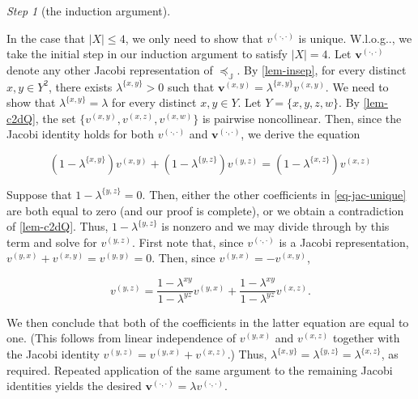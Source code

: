 \documentclass[ecta,nameyear,draft]{econsocart}
\makeatletter
\newcommand{\mbbj}{\mathds J}
\newcommand{\xy}{{(x, y)}}
\newcommand{\yx}{{(y, x)}}
\newcommand{\yz}{{(y,z)}}
\newcommand{\xz}{{(x,z)}}
\newcommand{\xw}{{(x,w)}}
\newcommand{\dd}{{(\cdot,\cdot)}}
\newcommand\Wlog{W\@.l\@.o\@.g\@ifnextchar.{}{.\@}}
\theoremstyle{plain}
\theoremstyle{remark}
\newtheorem{step}{Step}[section]
\makeatother
\begin{document}
\begin{appendix}
\begin{step}[the induction argument]
\begin{proofEnd}
    In the case that $\lvert X \rvert \leq 4$, we only need to show that $v^{
      \dd}$ is unique. \Wlog, we take the initial step in our induction argument
    to satisfy $\lvert X \rvert = 4$.  Let $\mathbf v^{\dd}$ denote any other
    Jacobi representation of $\preceq_{\mbbj}$. By \cref{lem-insep}, for every
    distinct $x , y \in Y^{2}$, there exists $\lambda^{\{x,y\}}> 0$ such that
    $\mathbf v^{\xy} = \lambda^{\{x,y\}} v^{\xy}$. We need to show that
    $\lambda^{\{x,y\}} = \lambda$ for every distinct $x , y \in Y$.  Let $Y = \{
      x , y , z , w \}$.  By \cref{lem-c2dQ}, the set $\{v^{\xy} , v^{\xz}
    , v^{\xw} \}$ is pairwise noncollinear. Then, since the Jacobi identity
    holds for both $v^{\dd}$ and $\mathbf v^{\dd}$, we derive the equation
  \begin{linenomath*}
    \begin{equation}\label{eq-jac-unique}
      (1 - \lambda^{\{x,y\}})v^{\xy} + (1 - \lambda^{\{y,z\}})v^{\yz} =
      (1 - \lambda^{\{x,z\}}) v^{\xz}
    \end{equation}
  \end{linenomath*}
  Suppose that $1 - \lambda^{\{y,z\}} = 0$. Then, either the other coefficients
    in \cref{eq-jac-unique} are both equal to zero (and our proof is complete),
    or we obtain a contradiction of \cref{lem-c2dQ}.  Thus, $1 - \lambda
   ^{\{y,z\}}$ is nonzero and we may divide through by this term and solve for
    $v^{\yz}$. First note that, since $v^{\dd}$ is a Jacobi representation,
    $v^{\yx}+ v^{\xy} = v^{(y,y)} = 0$. Then, since $v^{\yx} = - v^{
      \xy}$, 
  \begin{linenomath*}
    \begin{equation*}
      v^{\yz} = \frac{1- \lambda^{x y}}{1 - \lambda^{y z}} v^{\yx} +
      \frac{1 - \lambda^{x y}}{1 - \lambda^{y z}} v^{\xz}.
    \end{equation*}
    \end{linenomath*}
  We then conclude that both of the coefficients in the latter equation are equal
    to one. (This follows from linear independence of $v^{\yx}$ and $v^{\xz
   }$ together with the Jacobi identity $v^{\yz} = v^{\yx} + v^{\xz}$.)
    Thus, $\lambda^{\{x,y\}} = \lambda^{\{y,z\}} = \lambda^{\{x,z\}}$, as
    required. Repeated application of the same argument to the remaining Jacobi
    identities yields the desired $\mathbf v^{\dd}= \lambda v^{\dd}$.
  

\end{proofEnd}
\end{step}
\end{appendix}
\end{document}
